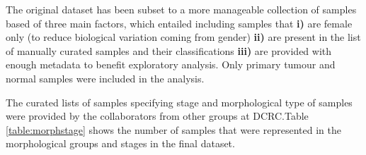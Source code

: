     The original dataset has been subset to a more manageable collection of samples based of three main factors, which entailed including samples that \textbf{ i)} are female only (to reduce biological variation coming from gender) \textbf{ii)} are present in the list of manually curated samples and their classifications \textbf{iii)} are provided with enough metadata to benefit exploratory analysis. Only primary tumour and normal samples were included in the analysis.
    
    The curated lists of samples specifying stage and morphological type of samples were provided by the collaborators from other groups at DCRC.Table \ref{table:morphstage} shows the number of samples that were represented in the morphological groups and stages in the final dataset. 
    
    
